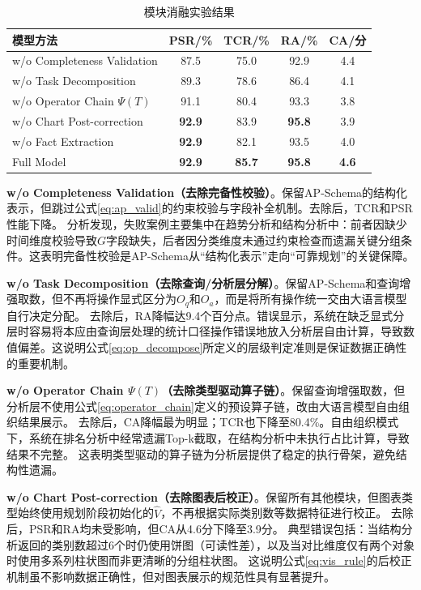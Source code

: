 \begin{table}[htbp]
	\setlength{\abovecaptionskip}{5pt}
	\setlength{\belowcaptionskip}{5pt}
	\caption{模块消融实验结果}\label{tab:chap04_ablation}
	\centering
	\begin{tabular}{lcccc}
		\toprule
		模型方法 & PSR/\% & TCR/\% & RA/\% & CA/分 \\
		\midrule
		w/o Completeness Validation & 87.5 & 75.0 & 92.9 & 4.4 \\
		w/o Task Decomposition & 89.3 & 78.6 & 86.4 & 4.1 \\
		w/o Operator Chain $\Psi(T)$ & 91.1 & 80.4 & 93.3 & 3.8 \\
		w/o Chart Post-correction & \textbf{92.9} & 83.9 & \textbf{95.8} & 3.9 \\
		w/o Fact Extraction & \textbf{92.9} & 82.1 & 93.5 & 4.0 \\
		\midrule
		Full Model & \textbf{92.9} & \textbf{85.7} & \textbf{95.8} & \textbf{4.6} \\
		\bottomrule
	\end{tabular}
\end{table}

\textbf{w/o Completeness Validation（去除完备性校验）}。保留AP-Schema的结构化表示，但跳过公式\eqref{eq:ap_valid}的约束校验与字段补全机制。去除后，TCR和PSR性能下降。
分析发现，失败案例主要集中在趋势分析和结构分析中：前者因缺少时间维度校验导致$G$字段缺失，后者因分类维度未通过约束检查而遗漏关键分组条件。这表明完备性校验是AP-Schema从“结构化表示”走向“可靠规划”的关键保障。

\textbf{w/o Task Decomposition（去除查询/分析层分解）}。保留AP-Schema和查询增强取数，但不再将操作显式区分为$O_q$和$O_a$，而是将所有操作统一交由大语言模型自行决定分配。
去除后，RA降幅达9.4个百分点。错误显示，系统在缺乏显式分层时容易将本应由查询层处理的统计口径操作错误地放入分析层自由计算，导致数值偏差。这说明公式\eqref{eq:op_decompose}所定义的层级判定准则是保证数据正确性的重要机制。

\textbf{w/o Operator Chain $\Psi(T)$（去除类型驱动算子链）}。保留查询增强取数，但分析层不使用公式\eqref{eq:operator_chain}定义的预设算子链，改由大语言模型自由组织结果展示。
去除后，CA降幅最为明显；TCR也下降至80.4\%。自由组织模式下，系统在排名分析中经常遗漏Top-k截取，在结构分析中未执行占比计算，导致结果不完整。
这表明类型驱动的算子链为分析层提供了稳定的执行骨架，避免结构性遗漏。

\textbf{w/o Chart Post-correction（去除图表后校正）}。保留所有其他模块，但图表类型始终使用规划阶段初始化的$\hat{V}$，不再根据实际类别数等数据特征进行校正。
去除后，PSR和RA均未受影响，但CA从4.6分下降至3.9分。
典型错误包括：当结构分析返回的类别数超过6个时仍使用饼图（可读性差），以及当对比维度仅有两个对象时使用多系列柱状图而非更清晰的分组柱状图。
这说明公式\eqref{eq:vis_rule}的后校正机制虽不影响数据正确性，但对图表展示的规范性具有显著提升。

